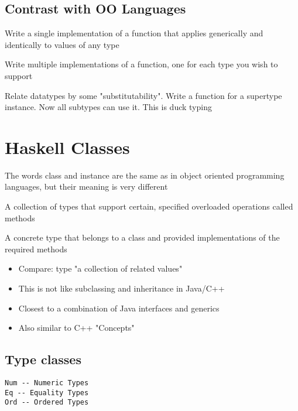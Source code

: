 \documentclass{article}[18pt]
\begin{document}
\subsection{Contrast with OO Languages}
\begin{defin}
Write a single implementation of a function that applies generically and identically to values of any type
\end{defin}
\begin{defin}
Write multiple implementations of a function, one for each type you wish to support
\end{defin}
\begin{defin}
Relate datatypes by some "substitutability". Write a function for a supertype instance. Now all subtypes can use it. This is duck typing
\end{defin}
\newpage
\section{Haskell Classes}
\begin{important}
	{The words class and instance are the same as in object oriented programming languages, but their meaning is very different}
\end{important}
\begin{defin}[Class]
A collection of types that support certain, specified overloaded operations called methods
\end{defin}
\begin{defin}[Instance]
A concrete type that belongs to a class and provided implementations of the required methods	
\end{defin}
\begin{itemize}
	\item Compare: type "a collection of related values"
	\item This is not like subclassing and inheritance in Java/C++
	\item Closest to a combination of Java interfaces and generics
	\item Also similar to C++ "Concepts"
\end{itemize}
\subsection{Type classes}
\begin{verbatim}
Num -- Numeric Types
Eq -- Equality Types
Ord -- Ordered Types
\end{verbatim}
\end{document}
